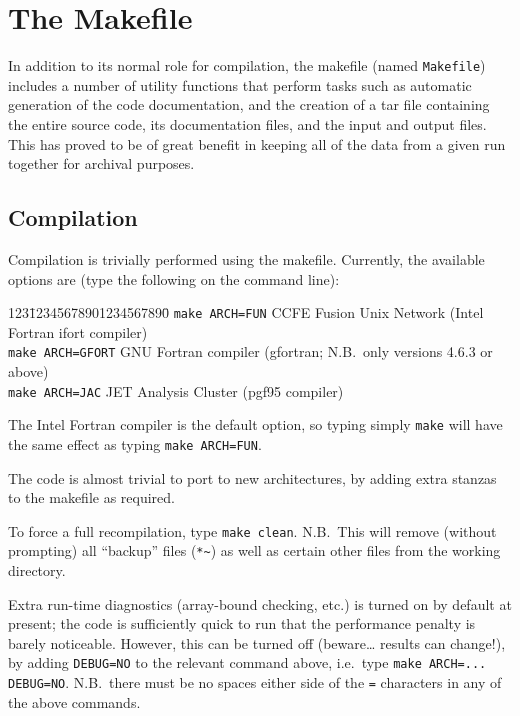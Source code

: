 \documentclass[11pt,a4paper]{report}
\begin{document}
\section{The Makefile}
\label{sec:makefile}

In addition to its normal role for compilation, the makefile (named
\texttt{Makefile}) includes a number of utility functions that perform tasks
such as automatic generation of the code documentation, and the creation of a
tar file containing the entire source code, its documentation files, and the
input and output files. This has proved to be of great benefit in keeping all
of the data from a given run together for archival purposes.

\subsection{Compilation}

Compilation is trivially performed using the makefile. Currently, the
available options are (type the following on the command line):
\begin{tabbing}
123\=12345678901234567890\= \kill
\> \texttt{make ARCH=FUN} \> CCFE Fusion Unix Network (Intel Fortran ifort compiler) \\
\> \texttt{make ARCH=GFORT} \> GNU Fortran compiler (gfortran; N.B.\ only versions
4.6.3 or above) \\
\> \texttt{make ARCH=JAC} \> JET Analysis Cluster (pgf95 compiler)
\end{tabbing}
The Intel Fortran compiler is the default option, so typing simply
\texttt{make} will have the same effect as typing \texttt{make ARCH=FUN}.

The code is almost trivial to port to new architectures, by adding extra
stanzas to the makefile as required.

To force a full recompilation, type \texttt{make clean}. N.B.\ This will
remove (without prompting) all ``backup'' files (\texttt{*\~}) as well as
certain other files from the working directory.

Extra run-time diagnostics (array-bound checking, etc.) is turned on by
default at present; the code is sufficiently quick to run that the performance
penalty is barely noticeable. However, this can be turned off (beware\ldots
results can change!), by adding \texttt{DEBUG=NO} to the relevant command
above, i.e.\ type \verb+make ARCH=... DEBUG=NO+.  N.B.\ there must be no
spaces either side of the \texttt{=} characters in any of the above commands.
\end{document}
